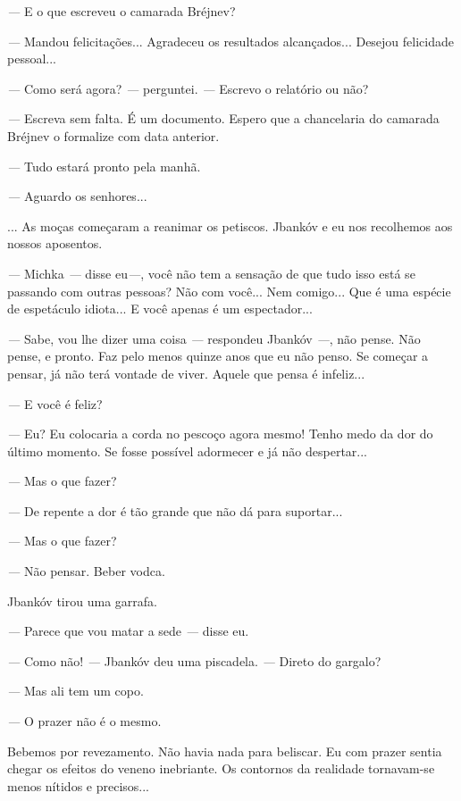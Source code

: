 \emph{---} E o que escreveu o camarada Bréjnev?

\emph{---} Mandou felicitações... Agradeceu os resultados alcançados...
Desejou felicidade pessoal...

\emph{---} Como será agora? \emph{---} perguntei. \emph{---} Escrevo o
relatório ou não?

\emph{---} Escreva sem falta. É um documento. Espero que a chancelaria
do camarada Bréjnev o formalize com data anterior.

\emph{---} Tudo estará pronto pela manhã.

\emph{---} Aguardo os senhores...

... As moças começaram a reanimar os petiscos. Jbankóv e eu nos
recolhemos aos nossos aposentos.

\emph{---} Michka \emph{---} disse eu\emph{---}, você não tem a sensação
de que tudo isso está se passando com outras pessoas? Não com você...
Nem comigo... Que é uma espécie de espetáculo idiota... E você apenas é
um espectador...

\emph{---} Sabe, vou lhe dizer uma coisa \emph{---} respondeu Jbankóv
\emph{---}, não pense. Não pense, e pronto. Faz pelo menos quinze anos
que eu não penso. Se começar a pensar, já não terá vontade de viver.
Aquele que pensa é infeliz...

\emph{---} E você é feliz?

\emph{---} Eu? Eu colocaria a corda no pescoço agora mesmo! Tenho medo
da dor do último momento. Se fosse possível adormecer e já não
despertar...

\emph{---} Mas o que fazer?

\emph{---} De repente a dor é tão grande que não dá para suportar...

\emph{---} Mas o que fazer?

\emph{---} Não pensar. Beber vodca.

Jbankóv tirou uma garrafa.

\emph{---} Parece que vou matar a sede \emph{---} disse eu.

\emph{---} Como não! \emph{---} Jbankóv deu uma piscadela. \emph{---}
Direto do gargalo?

\emph{---} Mas ali tem um copo.

\emph{---} O prazer não é o mesmo.

Bebemos por revezamento. Não havia nada para beliscar. Eu com prazer
sentia chegar os efeitos do veneno inebriante. Os contornos da realidade
tornavam-se menos nítidos e precisos...

